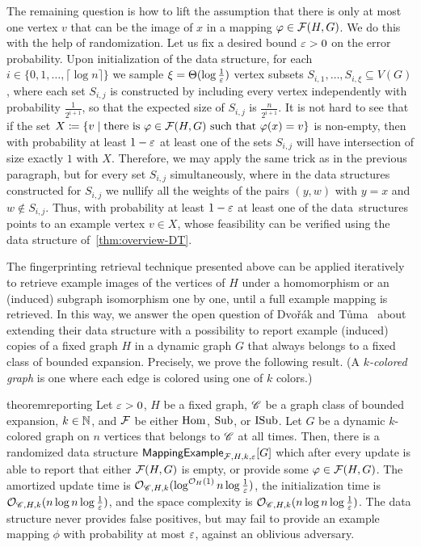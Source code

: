 The remaining question is how to lift the assumption that there is only at most one vertex $v$ that can be the image of $x$ in a mapping $\varphi\in \mathcal{F}(H,G)$. We do this with the help of randomization. Let us fix a desired bound $\varepsilon>0$ on the error probability. Upon initialization of the data structure, for each $i\in \{0,1,\ldots,\lceil \log n\rceil\}$ we sample $\xi=\Theta(\log \tfrac{1}{\varepsilon})$ vertex subsets $S_{i,1},\ldots,S_{i,\xi}\subseteq V(G)$, where each set $S_{i,j}$ is constructed by including every vertex independently with probability $\frac{1}{2^{i+1}}$, so that the expected size of $S_{i,j}$ is $\tfrac{n}{2^{i+1}}$. It is not hard to see that if the set $X\coloneqq \{v\mid \textrm{there is }\varphi\in \mathcal{F}(H,G)\textrm{ such that }\varphi(x)=v\}$ is non-empty, then with probability at least $1-\varepsilon$ at least one of the sets $S_{i,j}$ will have intersection of size exactly $1$ with $X$. Therefore, we may apply the same trick as in the previous paragraph, but for every set  $S_{i,j}$ simultaneously, where in the data structures constructed for $S_{i,j}$ we nullify all the weights of the pairs $(y,w)$ with $y=x$ and $w\notin S_{i,j}$. Thus, with probability at least $1-\varepsilon$ at least one of the data~structures points to an example vertex $v\in X$, whose feasibility can be verified using the data structure of~\cref{thm:overview-DT}.

The fingerprinting retrieval technique presented above can be applied iteratively to retrieve example images of the vertices of $H$ under a homomorphism or an (induced) subgraph isomorphism one by one, until a full example mapping is retrieved. In this way, we answer the open question of Dvo\v{r}\'ak and T\r{u}ma~\cite{DvorakT13} about extending their data structure with a possibility to report example (induced) copies of a fixed graph $H$ in a dynamic graph $G$ that always belongs to a fixed class of bounded expansion. Precisely, we prove the following result. (A \emph{$k$-colored graph} is one where each edge is colored using one of $k$ colors.)

\begin{restatable}{theorem}{reporting} \label{thm:dvorak-tuma-examples}
	Let $\varepsilon>0$, $H$ be a fixed graph, $\mathscr C$ be a graph class of bounded expansion, $k\in \mathbb{N}$, and $\mathcal{F}$ be either $\mathrm{Hom}$, $\mathrm{Sub}$, or $\mathrm{ISub}$. 
	Let $G$ be a dynamic $k$-colored
	graph on $n$ vertices that belongs to $\mathscr C$ at all times.
	Then, there is a randomized data structure $\mathsf{MappingExample}_{\mathcal{F}, H, k,\varepsilon}[G]$
	which after every update is able to report that either $\mathcal{F}(H, G)$ is empty, or provide some $\varphi \in \mathcal{F}(H, G)$. The amortized update time is $\mathcal{O}_{\mathscr C, H, k}(\log^{\mathcal{O}_H(1)} n \log{\frac{1}{\varepsilon}})$, the initialization time is $\mathcal{O}_{\mathscr C, H, k}(n \log n \log {\tfrac{1}{\varepsilon}})$, and the space complexity is $\mathcal{O}_{\mathscr C, H, k}(n \log n \log {\tfrac{1}{\varepsilon}})$.  The data structure never provides false positives, but may fail to provide an example mapping $\phi$ with probability at most $\varepsilon$, against an oblivious adversary.
\end{restatable}


